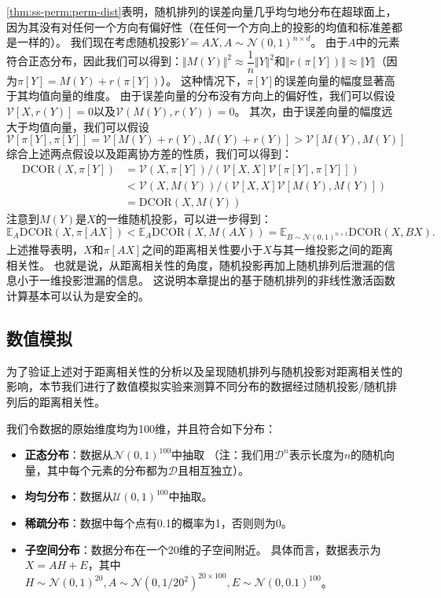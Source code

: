 \autoref{thm:ss-perm:perm-dist}表明，随机排列的误差向量几乎均匀地分布在超球面上，因为其没有对任何一个方向有偏好性（在任何一个方向上的投影的均值和标准差都是一样的）。
%
我们现在考虑随机投影$Y = AX, A \sim \mathcal N(0, 1)^{n\times d}$。
由于$A$中的元素符合正态分布，因此我们可以得到：$\Vert M(Y) \Vert^2 \approx  \dfrac{1}{n} \Vert Y \Vert^2$和$\Vert r(\pi[Y]) \Vert \approx \Vert Y \Vert$（因为$\pi[Y] = M(Y) + r(\pi[Y])$）。
%
这种情况下，$\pi[Y]$的误差向量的幅度显著高于其均值向量的维度。
%
由于误差向量的分布没有方向上的偏好性，我们可以假设$\mathcal{V}[X, r(Y)] = 0$以及$\mathcal{V}(M(Y), r(Y)) = 0$。
%
其次，由于误差向量的幅度远大于均值向量，我们可以假设
\begin{equation}
\mathcal{V}[\pi[Y], \pi[Y]] = \mathcal{V}[M(Y) + r(Y), M(Y) + r(Y)] > \mathcal{V}[M(Y), M(Y)]
\end{equation}
%
综合上述两点假设以及距离协方差的性质，我们可以得到：
\begin{equation}
\begin{split}
    \text{DCOR}(X, \pi[Y]) &= \mathcal{V}(X, \pi[Y]) / (\mathcal{V}[X, X] \mathcal{V}[\pi[Y], \pi[Y]]) \\
    & < \mathcal{V}(X, M(Y)) / (\mathcal{V}[X, X] \mathcal{V}[M(Y), M(Y)]) \\
    & = \text{DCOR}(X, M(Y))
\end{split}
\end{equation}
注意到$M(Y)$是$X$的一维随机投影，可以进一步得到：
\begin{equation}
    \mathbb E_A \text{DCOR}(X, \pi[AX]) < \mathbb E_A \text{DCOR}(X, M(AX)) = \mathbb E_{B \sim \mathcal N(0, 1)^{n\times 1}} \text{DCOR}(X, BX).
\end{equation}
%
上述推导表明，$X$和$\pi[AX]$之间的距离相关性要小于$X$与其一维投影之间的距离相关性。
也就是说，从距离相关性的角度，随机投影再加上随机排列后泄漏的信息小于一维投影泄漏的信息。
%
这说明本章提出的基于随机排列的非线性激活函数计算基本可以认为是安全的。


\subsection{数值模拟}
为了验证上述对于距离相关性的分析以及呈现随机排列与随机投影对距离相关性的影响，本节我们进行了数值模拟实验来测算不同分布的数据经过随机投影/随机排列后的距离相关性。
%

我们令数据的原始维度均为100维，并且符合如下分布：
\begin{itemize}
    \item \textbf{正态分布}：数据从$\mathcal N(0, 1)^{100}$中抽取
    （注：我们用$\mathcal D^{n}$表示长度为$n$的随机向量，其中每个元素的分布都为$\mathcal D$且相互独立）。
    \item \textbf{均匀分布}：数据从$\mathcal U(0, 1)^{100}$中抽取。
    \item \textbf{稀疏分布}：数据中每个点有0.1的概率为1，否则则为0。
    \item \textbf{子空间分布}：数据分布在一个20维的子空间附近。
    具体而言，数据表示为$X = AH + E$，其中$H \sim \mathcal N(0, 1)^{20}, A \sim \mathcal N(0, 1/{20^2})^{20\times 100}, E \sim \mathcal N(0, 0.1)^{100}$。
\end{itemize}


